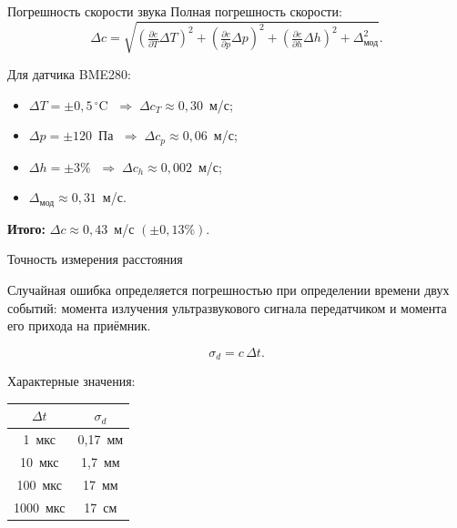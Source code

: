 \documentclass[10pt]{beamer}
\begin{document}
\begin{frame}{Погрешность скорости звука}
\justifying
Полная погрешность скорости:
\begin{equation*}
\Delta c = \sqrt{\left(\tfrac{\partial c}{\partial T}\Delta T\right)^2
+ \left(\tfrac{\partial c}{\partial p}\Delta p\right)^2
+ \left(\tfrac{\partial c}{\partial h}\Delta h\right)^2
+ \Delta_{\text{мод}}^2}.
\end{equation*}

\smallskip

Для датчика BME280:
\begin{itemize}
\item $\Delta T = \pm 0{,}5\,^\circ$C $\;\Rightarrow\;\Delta c_T \approx 0{,}30$~м/с;
\item $\Delta p = \pm 120$~Па $\;\Rightarrow\;\Delta c_p \approx 0{,}06$~м/с;
\item $\Delta h = \pm 3\%$ $\;\Rightarrow\;\Delta c_h \approx 0{,}002$~м/с;
\item $\Delta_{\text{мод}} \approx 0{,}31$~м/с.
\end{itemize}

\bigskip

{\bf Итого:} $\Delta c \approx 0{,}43$~м/с $(\pm 0{,}13\%)$.

\end{frame}

\begin{frame}{Точность измерения расстояния}
  \justifying
  
  \smallskip
  
  Случайная ошибка определяется погрешностью при определении времени двух событий: момента излучения
  ультразвукового сигнала передатчиком и момента его прихода на приёмник.
  
  \smallskip

  \begin{equation*}
  \sigma_d = c\,\Delta t.
  \end{equation*}
  
  Характерные значения:
  \begin{table}[h]
  \centering
  \begin{tabular}{cc}
  \toprule
  $\Delta t$ & $\sigma_d$ \\
  \midrule
  1~мкс    & 0{,}17~мм \\
  10~мкс   & 1{,}7~мм \\
  100~мкс  & 17~мм   \\
  1000~мкс & 17~см   \\
  \bottomrule
  \end{tabular}
  \end{table}
  
  \end{frame}
  
\end{document}
